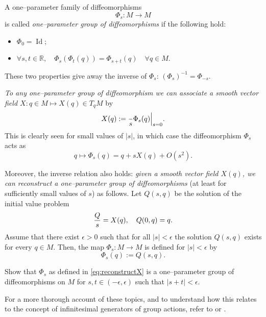 \documentclass[english,fontsize=11pt,paper=a5,oneside]{scrbook}
\newcommand{\R}{\mathbb{R}}
\let\d\relax
\newcommand{\d}{\mathrm{d}}
\DeclareMathOperator{\Id}{Id}
\theoremstyle{definition}
\newenvironment{remark}
  {\pushQED{\qed}\renewcommand{\qedsymbol}{$\lozenge$}\remarkx}
  {\popQED\endremarkx}
\newenvironment{exercise}
  {\pushQED{\qed}\renewcommand{\qedsymbol}{$\maltese$}\exercisex}
  {\popQED\endexercisex}
\begin{document}
A one--parameter family of diffeomorphisms
\begin{equation}
  \Phi_s : M \to M
\end{equation}
is called \emph{one--parameter group of diffeomorphisms} if the following hold:
\begin{itemize}
  \item $\Phi_0 = \Id$;
  \item $\forall s, t \in \R, \quad \Phi_s(\Phi_t(q)) = \Phi_{s+t}(q)\quad \forall q\in M$.
\end{itemize}
These two properties give away the inverse of $\Phi_s$: $(\Phi_s)^{-1} = \Phi_{-s}$.

\begin{remark}
  \emph{To any one--parameter group of diffeomorphism we can associate a smooth vector field $X : q\in M \mapsto X(q)\in T_qM$} by
  \begin{equation}
    X(q) := \frac{\d}{\d s} \Phi_s(q) \Big|_{s=0}.
  \end{equation}
  This is clearly seen for small values of $|s|$, in which case the diffeomorphism $\Phi_s$ acts as
  \begin{equation}\label{eq:infinitesimalSymmetryExp}
    q \mapsto \Phi_s(q) = q + s X(q) + O(s^2).
  \end{equation}

  Moreover, the inverse relation also holds: \emph{given a smooth vector field $X(q)$, we can reconstruct a one--parameter group of diffeomorphisms} (at least for sufficiently small values of $s$) as follows.
  Let $Q(s, q)$ be the solution of the initial value problem
  \begin{equation}\label{eq:NoetherCoords}
    \frac{\d Q}{\d s} = X(q), \quad Q(0, q) = q.
  \end{equation}
  Assume that there exist $\epsilon >0$ such that for all $|s|<\epsilon$ the solution $Q(s,q)$ exists for every $q\in M$.
  Then, the map $\Phi_s:M\to M$ is defined for $|s|<\epsilon$ by
  \begin{equation}\label{eq:reconstructX}
    \Phi_s(q) := Q(s, q).
  \end{equation}

  \begin{exercise}
    Show that $\Phi_s$ as defined in \eqref{eq:reconstructX} is a one--parameter group of diffeomorphisms on $M$ for $s,t \in(-\epsilon,\epsilon)$ such that $|s + t| < \epsilon$.
  \end{exercise}

  For a more thorough account of these topics, and to understand how this relates to the concept of infinitesimal generators of group actions, refer to \cite[Chapters 9 and 20]{book:lee} or \cite[Chapters 3 and 4]{lectures:aom:seri}.
\end{remark}
\end{document}
